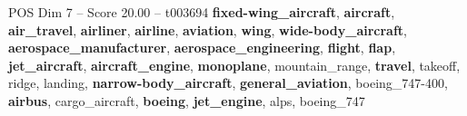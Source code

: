 \begin{textsample}{POS Dim 7 – Score 20.00 – t003694}  \label{ex:f7_pos_018}
\textbf{fixed-wing\_aircraft}, \textbf{aircraft}, \textbf{air\_travel}, \textbf{airliner}, \textbf{airline}, \textbf{aviation}, \textbf{wing}, \textbf{wide-body\_aircraft}, \textbf{aerospace\_manufacturer}, \textbf{aerospace\_engineering}, \textbf{flight}, \textbf{flap}, \textbf{jet\_aircraft}, \textbf{aircraft\_engine}, \textbf{monoplane}, mountain\_range, \textbf{travel}, takeoff, ridge, landing, \textbf{narrow-body\_aircraft}, \textbf{general\_aviation}, boeing\_747-400, \textbf{airbus}, cargo\_aircraft, \textbf{boeing}, \textbf{jet\_engine}, alps, boeing\_747

\end{textsample}
